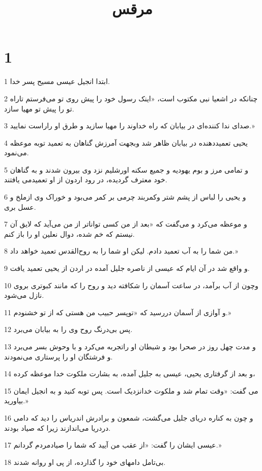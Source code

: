

\title{مرقس}


\chapter{1}

\par 1 ابتدا انجیل عیسی مسیح پسر خدا.
\par 2 چنانکه در اشعیا نبی مکتوب است، «اینک رسول خود را پیش روی تو می‌فرستم تاراه تو را پیش تو مهیا سازد.
\par 3 صدای ندا کننده‌ای در بیابان که راه خداوند را مهیا سازید و طرق او راراست نمایید.»
\par 4 یحیی تعمید‌دهنده در بیابان ظاهر شد وبجهت آمرزش گناهان به تعمید توبه موعظه می‌نمود.
\par 5 و تمامی مرز و بوم یهودیه و جمیع سکنه اورشلیم نزد وی بیرون شدند و به گناهان خود معترف گردیده، در رود اردون از او تعمیدمی یافتند.
\par 6 و یحیی را لباس از پشم شتر وکمربند چرمی بر کمر می‌بود و خوراک وی ازملخ و عسل بری.
\par 7 و موعظه می‌کرد و می‌گفت که «بعد از من کسی تواناتر از من می‌آید که لایق آن نیستم که خم شده، دوال نعلین او را باز کنم.
\par 8 من شما را به آب تعمید دادم. لیکن او شما را به روح‌القدس تعمید خواهد داد.»
\par 9 و واقع شد در آن ایام که عیسی از ناصره جلیل آمده در اردن از یحیی تعمید یافت.
\par 10 وچون از آب برآمد، در ساعت آسمان را شکافته دید و روح را که مانند کبوتری بروی نازل می‌شود.
\par 11 و آوازی از آسمان در‌رسید که «توپسر حبیب من هستی که از تو خشنودم.»
\par 12 پس بی‌درنگ روح وی را به بیابان می‌برد.
\par 13 و مدت چهل روز در صحرا بود و شیطان او راتجربه می‌کرد و با وحوش بسر می‌برد و فرشتگان او را پرستاری می‌نمودند.
\par 14 و بعد از گرفتاری یحیی، عیسی به جلیل آمده، به بشارت ملکوت خدا موعظه کرده،
\par 15 می گفت: «وقت تمام شد و ملکوت خدانزدیک است. پس توبه کنید و به انجیل ایمان بیاورید.»
\par 16 و چون به کناره دریای جلیل می‌گشت، شمعون و برادرش اندریاس را دید که دامی دردریا می‌اندازند زیرا که صیاد بودند.
\par 17 عیسی ایشان را گفت: «از عقب من آیید که شما را صیادمردم گردانم.»
\par 18 بی‌تامل دامهای خود را گذارده، از پی او روانه شدند.
